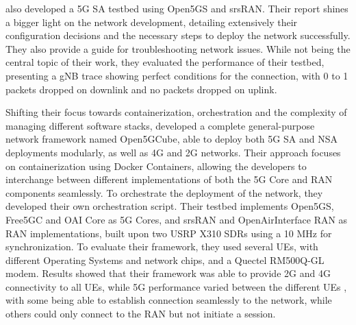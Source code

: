 \textcite{mamushiane2023deploying} also developed a 5G \gls{SA} testbed using Open5GS and srsRAN. Their report shines a bigger light on the network development, detailing extensively their configuration decisions and the necessary steps to deploy the network successfully. They also provide a guide for troubleshooting network issues.
While not being the central topic of their work, they evaluated the performance of their testbed, presenting a \gls{gNB} trace showing perfect conditions for the connection, with 0 to 1 packets dropped on downlink and no packets dropped on uplink.\bigskip

Shifting their focus towards containerization, orchestration and the complexity of managing different software stacks, \textcite{horstmann2025open5gcube} developed a complete general-purpose network framework named Open5GCube, able to deploy both 5G \gls{SA} and \gls{NSA} deployments modularly, as well as 4G  and 2G  networks.
Their approach focuses on containerization using Docker Containers, allowing the developers to interchange between different implementations of both the 5G Core and \gls{RAN} components seamlessly. To orchestrate the deployment of the network, they developed their own orchestration script.
Their testbed implements Open5GS, Free5GC and OAI Core as 5G Cores, and srsRAN and OpenAirInterface RAN as \gls{RAN} implementations, built upon two USRP X310 \glspl{SDR} using a 10 MHz  for synchronization.
To evaluate their framework, they used several  \glspl{UE}, with different Operating Systems and network chips, and a Quectel RM500Q-GL modem. Results showed that their framework was able to provide 2G and 4G connectivity to all \glspl{UE}, while 5G performance varied between the different \glspl{UE} , with some being able to establish connection seamlessly to the network, while others could only connect to the RAN but not initiate a  session. \bigskip


